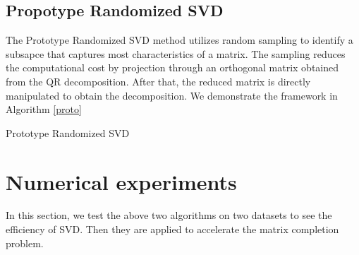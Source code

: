 \documentclass{article}
\begin{document}
\subsection{Propotype Randomized SVD}
The Prototype Randomized SVD method utilizes random sampling to identify a subsapce that captures most characteristics of a matrix. The sampling reduces the computational cost by projection through an orthogonal matrix obtained from the QR decomposition. After that, the reduced matrix is directly manipulated to obtain the decomposition. We demonstrate the framework in Algorithm \ref{proto}
\begin{algorithm}[p]
    \caption{Prototype Randomized SVD}
    \begin{algorithmic}[1]\label{proto}
    \end{algorithmic}
\end{algorithm}
\section{Numerical experiments}
In this section, we test the above two algorithms on two datasets to see the efficiency of SVD. Then they are applied to accelerate the matrix completion problem.
\end{document}
